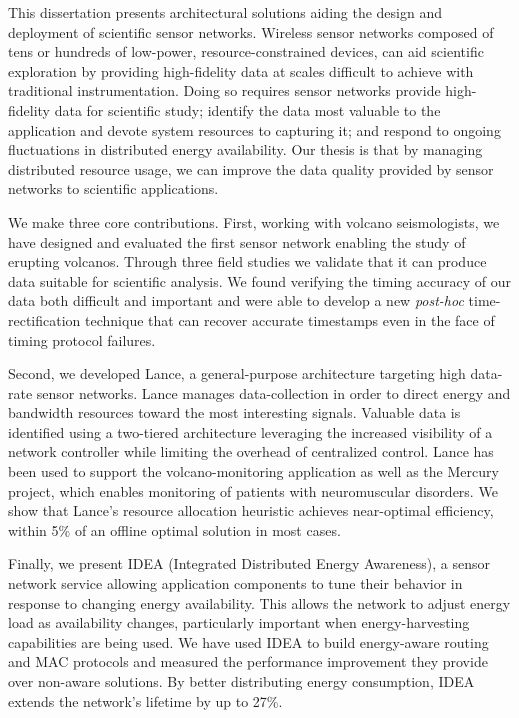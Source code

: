 \hspace{0.25in}

This dissertation presents architectural solutions aiding the design and
deployment of scientific sensor networks. Wireless sensor networks composed
of tens or hundreds of low-power, resource-constrained devices, can aid
scientific exploration by providing high-fidelity data at scales difficult to
achieve with traditional instrumentation. Doing so requires sensor networks
provide high-fidelity data for scientific study; identify the data most
valuable to the application and devote system resources to capturing it; and
respond to ongoing fluctuations in distributed energy availability. Our
thesis is that by managing distributed resource usage, we can improve the
data quality provided by sensor networks to scientific applications.

We make three core contributions. First, working with volcano seismologists,
we have designed and evaluated the first sensor network enabling the study of
erupting volcanos. Through three field studies we validate that it can
produce data suitable for scientific analysis. We found verifying the timing
accuracy of our data both difficult and important and were able to develop a
new \textit{post-hoc} time-rectification technique that can recover accurate
timestamps even in the face of timing protocol failures.

Second, we developed Lance, a general-purpose architecture targeting high
data-rate sensor networks. Lance manages data-collection in order to direct
energy and bandwidth resources toward the most interesting signals. Valuable
data is identified using a two-tiered architecture leveraging the increased
visibility of a network controller while limiting the overhead of centralized
control. Lance has been used to support the volcano-monitoring application as
well as the Mercury project, which enables monitoring of patients with
neuromuscular disorders. We show that Lance's resource allocation heuristic
achieves near-optimal efficiency, within 5\% of an offline optimal solution
in most cases.

Finally, we present IDEA (Integrated Distributed Energy Awareness), a sensor
network service allowing application components to tune their behavior in
response to changing energy availability. This allows the network to adjust
energy load as availability changes, particularly important when
energy-harvesting capabilities are being used. We have used IDEA to build
energy-aware routing and MAC protocols and measured the performance
improvement they provide over non-aware solutions. By better distributing
energy consumption, IDEA extends the network's lifetime by up to 27\%.
